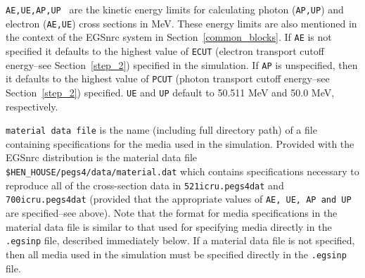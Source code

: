 \begin{description}
\item {\tt AE,UE,AP,UP } are the kinetic energy limits for calculating photon ({\tt AP,UP}) and electron ({\tt AE,UE}) cross sections in
MeV.  These energy limits are also mentioned in the context of the EGSnrc system in Section~\ref{common_blocks}. 
If {\tt AE} is
not specified it defaults to the highest value of {\tt ECUT} (electron transport cutoff energy--see Section~\ref{step_2}) specified
in the simulation.  If
{\tt AP} is unspecified, then it defaults to the highest value of {\tt PCUT} (photon transport cutoff energy--see Section~\ref{step_2})
specified.  {\tt UE} and {\tt UP} default to 50.511 MeV and 50.0 MeV, respectively.

\item {\tt material data file} is the name (including full directory path) of a file containing specifications for the media used
in the simulation.  Provided with the EGSnrc distribution is the material data file {\tt \$HEN\_HOUSE/pegs4/data/material.dat} which
contains specifications necessary to reproduce all of the cross-section data in {\tt 521icru.pegs4dat} and {\tt 700icru.pegs4dat}
(provided that the appropriate values of {\tt AE, UE, AP and UP} are specified--see above).  Note that the format for
media specifications in the material data file is similar to that used for specifying media directly in the
{\tt .egsinp} file, described immediately below.  If a material data file is not specified, then all media used in the simulation
must be specified directly in the {\tt .egsinp} file.


\end{description}
